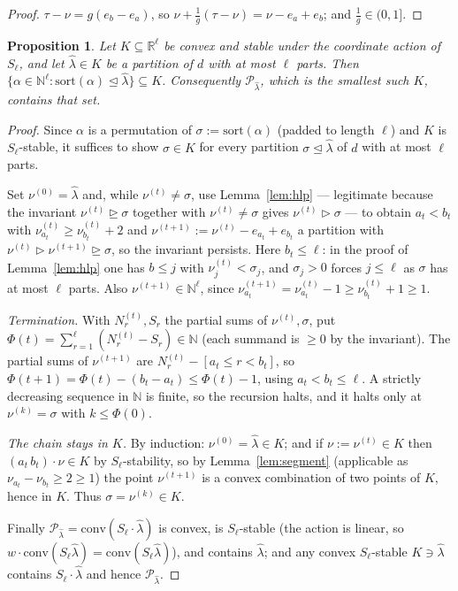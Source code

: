 \documentclass[11pt]{article}
\theoremstyle{plain}
\newtheorem{prop}[thm]{Proposition}
\theoremstyle{definition}
\newcommand{\N}{\mathbb{N}}
\newcommand{\R}{\mathbb{R}}
\begin{document}
\begin{proof}
$\tau-\nu=g(e_b-e_a)$, so $\nu+\tfrac1g(\tau-\nu)=\nu-e_a+e_b$; and $\tfrac1g\in(0,1]$.
\end{proof}

\begin{prop}\label{prop:minimal}
Let $K\subseteq\R^{\ell}$ be convex and stable under the coordinate action of $S_\ell$, and let
$\hat\lambda\in K$ be a partition of $d$ with at most $\ell$ parts. Then
$\{\alpha\in\N^{\ell}:\mathrm{sort}(\alpha)\trianglelefteq\hat\lambda\}\subseteq K$.
Consequently $\mathcal{P}_{\hat\lambda}$, which is the smallest such $K$, contains that set.
\end{prop}

\begin{proof}
Since $\alpha$ is a permutation of $\sigma:=\mathrm{sort}(\alpha)$ (padded to length $\ell$) and
$K$ is $S_\ell$-stable, it suffices to show $\sigma\in K$ for every partition
$\sigma\trianglelefteq\hat\lambda$ of $d$ with at most $\ell$ parts.

Set $\nu^{(0)}=\hat\lambda$ and, while $\nu^{(t)}\ne\sigma$, use Lemma~\ref{lem:hlp} --- legitimate
because the invariant $\nu^{(t)}\trianglerighteq\sigma$ together with $\nu^{(t)}\ne\sigma$ gives
$\nu^{(t)}\rhd\sigma$ --- to obtain $a_t<b_t$ with
$\nu^{(t)}_{a_t}\ge\nu^{(t)}_{b_t}+2$ and $\nu^{(t+1)}:=\nu^{(t)}-e_{a_t}+e_{b_t}$ a partition
with $\nu^{(t)}\rhd\nu^{(t+1)}\trianglerighteq\sigma$, so the invariant persists. Here
$b_t\le\ell$: in the proof of Lemma~\ref{lem:hlp} one has $b\le j$ with
$\nu^{(t)}_j<\sigma_j$, and $\sigma_j>0$ forces $j\le\ell$ as $\sigma$ has at most $\ell$
parts. Also $\nu^{(t+1)}\in\N^{\ell}$, since
$\nu^{(t+1)}_{a_t}=\nu^{(t)}_{a_t}-1\ge\nu^{(t)}_{b_t}+1\ge1$.

\emph{Termination.} With $N^{(t)}_r,S_r$ the partial sums of $\nu^{(t)},\sigma$, put
$\Phi(t)=\sum_{r=1}^{\ell}(N^{(t)}_r-S_r)\in\N$ (each summand is $\ge0$ by the invariant). The
partial sums of $\nu^{(t+1)}$ are $N^{(t)}_r-[a_t\le r<b_t]$, so
$\Phi(t+1)=\Phi(t)-(b_t-a_t)\le\Phi(t)-1$, using $a_t<b_t\le\ell$. A strictly decreasing
sequence in $\N$ is finite, so the recursion halts, and it halts only at
$\nu^{(k)}=\sigma$ with $k\le\Phi(0)$.

\emph{The chain stays in $K$.} By induction: $\nu^{(0)}=\hat\lambda\in K$; and if
$\nu:=\nu^{(t)}\in K$ then $(a_t\,b_t)\cdot\nu\in K$ by $S_\ell$-stability, so by
Lemma~\ref{lem:segment} (applicable as $\nu_{a_t}-\nu_{b_t}\ge2\ge1$) the point
$\nu^{(t+1)}$ is a convex combination of two points of $K$, hence in $K$. Thus
$\sigma=\nu^{(k)}\in K$.

Finally $\mathcal{P}_{\hat\lambda}=\mathrm{conv}(S_\ell\cdot\hat\lambda)$ is convex, is
$S_\ell$-stable (the action is linear, so $w\cdot\mathrm{conv}(S_\ell\hat\lambda)
=\mathrm{conv}(S_\ell\hat\lambda)$), and contains $\hat\lambda$; and any convex $S_\ell$-stable
$K\ni\hat\lambda$ contains $S_\ell\cdot\hat\lambda$ and hence $\mathcal{P}_{\hat\lambda}$.
\end{proof}
\end{document}

